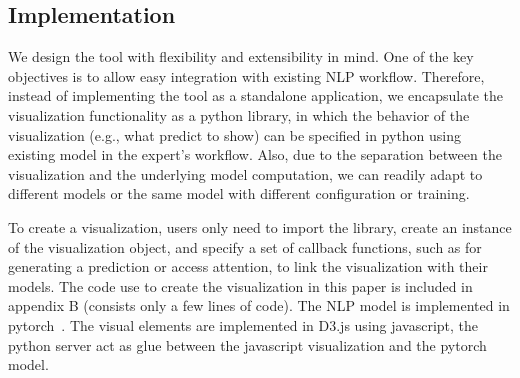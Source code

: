 \subsection{Implementation}
\label{sec:implementation}
We design the tool with flexibility and extensibility in mind. One of the key objectives is to allow easy integration with existing NLP workflow. Therefore, instead of implementing the tool as a standalone application, we encapsulate the visualization functionality as a python library, in which the behavior of the visualization (e.g., what predict to show) can be specified in python using existing model in the expert's workflow. Also, due to the separation between the visualization and the underlying model computation, we can readily adapt to different models or the same model with different configuration or training. 

To create a visualization, users only need to import the library, create an instance of the visualization object, and specify a set of callback functions, such as for generating a prediction or access attention, to link the visualization with their models. The code use to create the visualization in this paper is included in appendix B (consists only a few lines of code).
%
The NLP model is implemented in pytorch~\cite{PaszkeGrossChintala2017}.
The visual elements are implemented in D3.js using javascript, the python server act as glue between the javascript visualization and the pytorch model.
